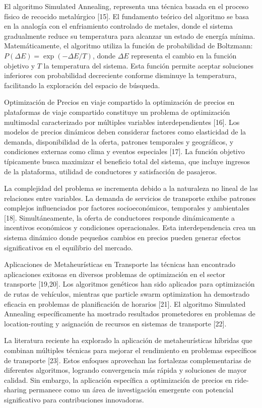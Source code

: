 \documentclass[12pt,a4paper,twocolumn]{article}
\begin{document}
El algoritmo Simulated Annealing, representa una técnica basada en el proceso físico de recocido metalúrgico [15]. El fundamento teórico del algoritmo se basa en la analogía con el enfriamiento controlado de metales, donde el sistema gradualmente reduce su temperatura para alcanzar un estado de energía mínima. Matemáticamente, el algoritmo utiliza la función de probabilidad de Boltzmann: $P(\Delta E) = \exp(-\Delta E/T)$, donde $\Delta E$ representa el cambio en la función objetivo y $T$ la temperatura del sistema. Esta función permite aceptar soluciones inferiores con probabilidad decreciente conforme disminuye la temperatura, facilitando la exploración del espacio de búsqueda.

Optimización de Precios en viaje compartido la optimización de precios en plataformas de viaje compartido constituye un problema de optimización multimodal caracterizado por múltiples variables interdependientes [16]. Los modelos de precios dinámicos deben considerar factores como elasticidad de la demanda, disponibilidad de la oferta, patrones temporales y geográficos, y condiciones externas como clima y eventos especiales [17]. La función objetivo típicamente busca maximizar el beneficio total del sistema, que incluye ingresos de la plataforma, utilidad de conductores y satisfacción de pasajeros.

La complejidad del problema se incrementa debido a la naturaleza no lineal de las relaciones entre variables. La demanda de servicios de transporte exhibe patrones complejos influenciados por factores socioeconómicos, temporales y ambientales [18]. Simultáneamente, la oferta de conductores responde dinámicamente a incentivos económicos y condiciones operacionales. Esta interdependencia crea un sistema dinámico donde pequeños cambios en precios pueden generar efectos significativos en el equilibrio del mercado.

Aplicaciones de Metaheurísticas en Transporte las técnicas han encontrado aplicaciones exitosas en diversos problemas de optimización en el sector transporte [19,20]. Los algoritmos genéticos han sido aplicados para optimización de rutas de vehículos, mientras que particle swarm optimization ha demostrado eficacia en problemas de planificación de horarios [21]. El algoritmo Simulated Annealing específicamente ha mostrado resultados prometedores en problemas de location-routing y asignación de recursos en sistemas de transporte [22].

La literatura reciente ha explorado la aplicación de metaheurísticas híbridas que combinan múltiples técnicas para mejorar el rendimiento en problemas específicos de transporte [23]. Estos enfoques aprovechan las fortalezas complementarias de diferentes algoritmos, logrando convergencia más rápida y soluciones de mayor calidad. Sin embargo, la aplicación específica a optimización de precios en ride-sharing permanece como un área de investigación emergente con potencial significativo para contribuciones innovadoras.
\end{document}
